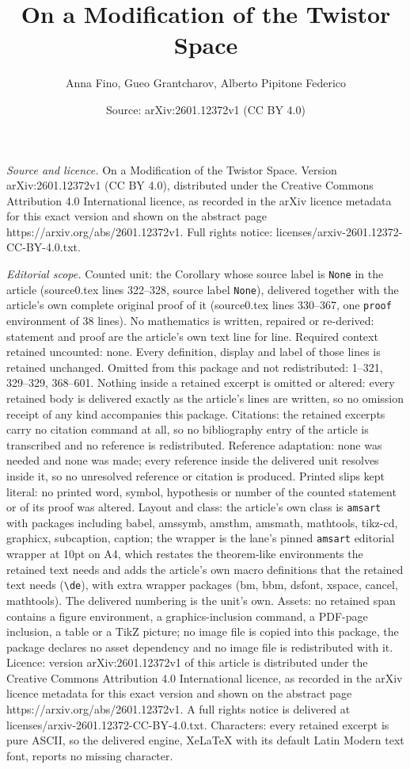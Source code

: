 \documentclass[10pt,a4paper]{amsart}
\title[On a Modification of the Twistor Space]{On a Modification of the Twistor Space}
\author{Anna Fino, Gueo Grantcharov, Alberto Pipitone Federico}
\date{Source: arXiv:2601.12372v1 (CC BY 4.0)}
\begin{document}
\maketitle

\noindent\emph{Source and licence.} On a Modification of the Twistor Space. Version arXiv:2601.12372v1 (CC BY 4.0), distributed under the Creative Commons Attribution 4.0 International licence, as recorded in the arXiv licence metadata for this exact version and shown on the abstract page https://arxiv.org/abs/2601.12372v1. Full rights notice: licenses/arxiv-2601.12372-CC-BY-4.0.txt.\par\smallskip

\noindent\textit{Editorial scope.} Counted unit: the Corollary whose source label is \texttt{None} in the article (source0.tex lines 322--328, source label \texttt{None}), delivered together with the article's own complete original proof of it (source0.tex lines 330--367, one \texttt{proof} environment of 38 lines). No mathematics is written, repaired or re-derived: statement and proof are the article's own text line for line. Required context retained uncounted: none. Every definition, display and label of those lines is retained unchanged. Omitted from this package and not redistributed: 1--321, 329--329, 368--601. Nothing inside a retained excerpt is omitted or altered: every retained body is delivered exactly as the article's lines are written, so no omission receipt of any kind accompanies this package. Citations: the retained excerpts carry no citation command at all, so no bibliography entry of the article is transcribed and no reference is redistributed. Reference adaptation: none was needed and none was made; every reference inside the delivered unit resolves inside it, so no unresolved reference or citation is produced. Printed slips kept literal: no printed word, symbol, hypothesis or number of the counted statement or of its proof was altered. Layout and class: the article's own class is \texttt{amsart} with packages including babel, amssymb, amsthm, amsmath, mathtools, tikz-cd, graphicx, subcaption, caption; the wrapper is the lane's pinned \texttt{amsart} editorial wrapper at 10pt on A4, which restates the theorem-like environments the retained text needs and adds the article's own macro definitions that the retained text needs (\texttt{\textbackslash de}), with extra wrapper packages (bm, bbm, dsfont, xspace, cancel, mathtools). The delivered numbering is the unit's own. Assets: no retained span contains a figure environment, a graphics-inclusion command, a PDF-page inclusion, a table or a TikZ picture; no image file is copied into this package, the package declares no asset dependency and no image file is redistributed with it. Licence: version arXiv:2601.12372v1 of this article is distributed under the Creative Commons Attribution 4.0 International licence, as recorded in the arXiv licence metadata for this exact version and shown on the abstract page https://arxiv.org/abs/2601.12372v1. A full rights notice is delivered at licenses/arxiv-2601.12372-CC-BY-4.0.txt. Characters: every retained excerpt is pure ASCII, so the delivered engine, XeLaTeX with its default Latin Modern text font, reports no missing character.
\end{document}
